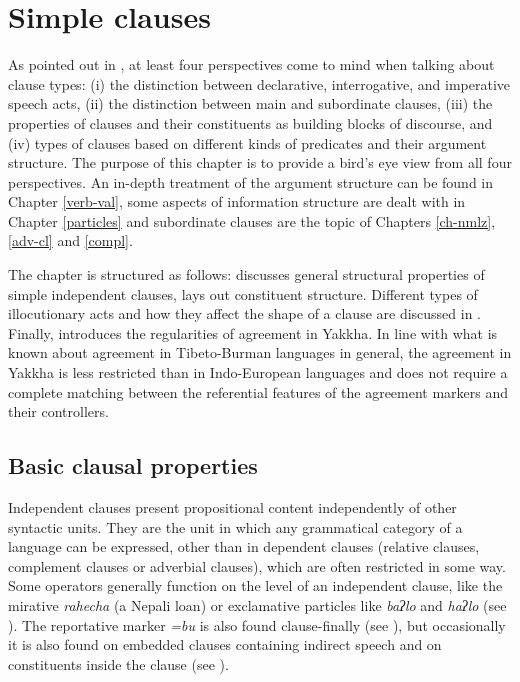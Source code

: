 ﻿\chapter{Simple clauses}\label{simp-cl}

As pointed out in \citet[224]{Dryer2007Clause}, at least four perspectives come to mind when talking about clause types: (i) the  distinction between declarative, interrogative, and imperative speech acts, (ii) the distinction between main and subordinate clauses, (iii) the properties of clauses and their constituents as building blocks of discourse, and (iv) types of clauses based on different kinds of predicates and their argument structure. The purpose of this chapter is to provide a bird's eye view from all four perspectives. An in-depth treatment of the argument structure can be found in Chapter \ref{verb-val}, some aspects of information structure are dealt with in Chapter \ref{particles} and subordinate clauses are the topic of  Chapters \ref{ch-nmlz},  \ref{adv-cl} and  \ref{compl}.  

The chapter is structured as follows:  discusses general structural properties of simple independent clauses,  lays out constituent structure. Different types of illocutionary acts and how they affect the shape of a clause are discussed in . Finally,  introduces the regularities of agreement in Yakkha. In line with what is known about agreement in Tibeto-Burman languages in general, the agreement in Yakkha is less restricted than in Indo-European languages and does not require a complete matching between the referential features of the agreement markers and their controllers.

\section{Basic clausal properties}\label{simp-cl1}

Independent clauses present propositional content independently of other syntactic units. They are the unit in which any grammatical category of a language can be expressed, other than in dependent clauses (relative clauses, complement clauses or adverbial clauses), which are often restricted in some way. Some operators generally function on the level of an independent clause, like the mirative \emph{rahecha} (a Nepali loan) or  exclamative particles like  \emph{baʔlo} and \emph{haʔlo} (see \Next[a]). The reportative marker \emph{=bu} is also found clause-finally (see \Next[b]), but occasionally it is also found   on embedded clauses containing indirect speech and on constituents inside the clause (see ). 
 

